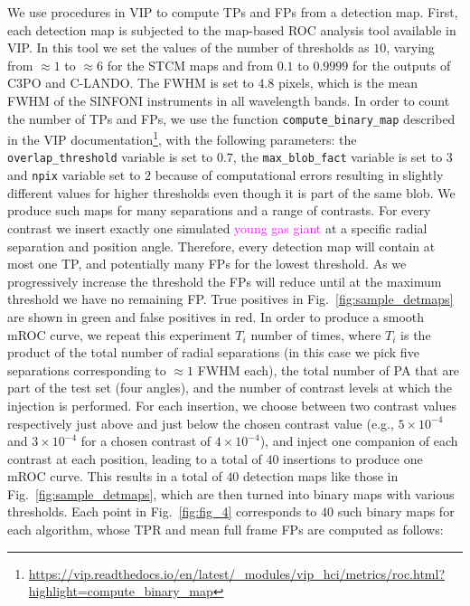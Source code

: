 \documentclass[referee]{aa} %
\newcommand{\newchange}[1]{\textcolor{magenta}{#1}}
\begin{document}
We use procedures in VIP \citep{2017AJGomezVIP,2023Christiaens} to compute TPs and FPs from a detection map. First, each detection map is subjected to the map-based ROC analysis tool available in VIP. In this tool we set the values of the number of thresholds as $10$, varying from $\approx 1$ to $\approx 6$ for the STCM maps and from $0.1$ to $0.9999$ for the outputs of C3PO and C-LANDO. The FWHM is set to $4.8$ pixels, which is the mean FWHM of the SINFONI instruments in all wavelength bands. 
In order to count the number of TPs and FPs, we use the function \texttt{compute\_binary\_map} described in the VIP documentation\footnote{\url{https://vip.readthedocs.io/en/latest/_modules/vip_hci/metrics/roc.html?highlight=compute_binary_map}}, with the following parameters: the \texttt{overlap\_threshold} variable is set to $0.7$, the \texttt{max\_blob\_fact} variable is set to $3$ and \texttt{npix} variable set to $2$ because of computational errors resulting in slightly different values for higher thresholds even though it is part of the same blob.
We produce such maps for many separations and a range of contrasts.
For every contrast we insert exactly one simulated \newchange{young gas giant} at a specific radial separation and position angle.
Therefore, every detection map will contain at most one TP, and potentially many FPs for the lowest threshold. 
As we progressively increase the threshold the FPs will reduce until at the maximum threshold we have no remaining FP. 
True positives in Fig.~\ref{fig:sample_detmaps} are shown in green and false positives in red.
In order to produce a smooth mROC curve, we repeat this experiment $T_{i}$ number of times, where $T_{i}$ is the product of the total number of radial separations (in this case we pick five separations corresponding to $\approx 1$ FWHM each), the total number of PA that are part of the test set (four angles), and the number of contrast levels at which the injection is performed.
For each insertion, we choose between two contrast values respectively just above and just below the chosen contrast value (e.g., $5\times10^{-4}$ and $3\times10^{-4}$ for a chosen contrast of $4\times10^{-4}$), and inject one companion of each contrast at each position, leading to a total of $40$ insertions to produce one mROC curve.
This results in a total of $40$ detection maps like those in Fig.~\ref{fig:sample_detmaps}, which are then turned into binary maps with various thresholds. 
Each point in Fig.~\ref{fig:fig_4} corresponds to $40$ such binary maps for each algorithm, whose TPR and mean full frame FPs are computed as follows:
\end{document}
